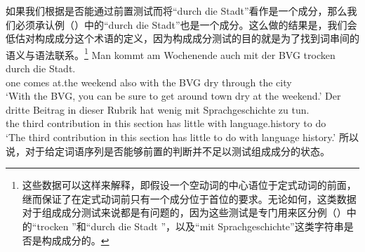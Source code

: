 如果我们根据是否能通过前置测试而将“durch die Stadt”看作是一个成分，那么我们必须承认例（）中的“durch die Stadt”也是一个成分。这么做的结果是，我们会低估对构成成分这个术语的定义，因为构成成分测试的目的就是为了找到词串间的语义与语法联系。\footnote{这些数据可以这样来解释，即假设一个空动词的中心语位于定式动词的前面，继而保证了在定式动词前只有一个成分位于首位的要求。\citep{Mueller2005d,MuellerGS}无论如何，这类数据对于组成成分测试来说都是有问题的，因为这些测试是专门用来区分例（）中的“trocken ”和“durch die Stadt ”，以及“mit Sprachgeschichte”这类字符串是否是构成成分的。}
\eal
\ex 
\gll Man kommt am Wochenende auch mit der BVG trocken durch die Stadt.\\
     one comes at.the weekend also with the BVG dry through the city\\
\glt `With the BVG, you can be sure to get around town dry at the weekend.'
\ex 
\gll Der dritte Beitrag in dieser Rubrik hat wenig mit Sprachgeschichte zu tun.\\
     the third  contribution in this section  has little with language.history to do\\
\glt `The third contribution in this section has little to do with language history.'
\zl
所以说，对于给定词语序列是否能够前置的判断并不足以测试组成成分的状态。

